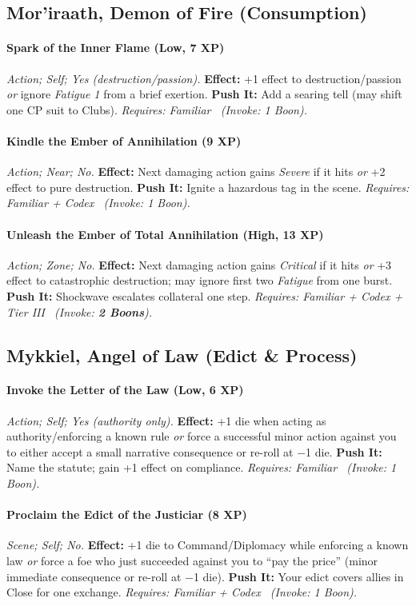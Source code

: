 \documentclass[12pt,twoside]{book}
\begin{document}
\subsection{Mor’iraath, Demon of Fire (Consumption)}
\paragraph{Spark of the Inner Flame (Low, 7 XP)} \emph{Action; Self; Yes (destruction/passion).}
\textbf{Effect:} +1 effect to destruction/passion \emph{or} ignore \emph{Fatigue 1} from a brief exertion.
\textbf{Push It:} Add a searing tell (may shift one CP suit to Clubs).
\emph{Requires: Familiar \ (\textit{Invoke:} 1 Boon).}
\paragraph{Kindle the Ember of Annihilation (9 XP)} \emph{Action; Near; No.}
\textbf{Effect:} Next damaging action gains \emph{Severe} if it hits \emph{or} +2 effect to pure destruction.
\textbf{Push It:} Ignite a hazardous tag in the scene.
\emph{Requires: Familiar + Codex \ (\textit{Invoke:} 1 Boon).}
\paragraph{Unleash the Ember of Total Annihilation (High, 13 XP)} \emph{Action; Zone; No.}
\textbf{Effect:} Next damaging action gains \emph{Critical} if it hits \emph{or} +3 effect to catastrophic destruction; may ignore first two \emph{Fatigue} from one burst.
\textbf{Push It:} Shockwave escalates collateral one step.
\emph{Requires: Familiar + Codex + Tier III \ (\textit{Invoke:} \textbf{2 Boons}).}

\subsection{Mykkiel, Angel of Law (Edict \& Process)}
\paragraph{Invoke the Letter of the Law (Low, 6 XP)} \emph{Action; Self; Yes (authority only).}
\textbf{Effect:} +1 die when acting as authority/enforcing a known rule \emph{or} force a successful minor action against you to either accept a small narrative consequence or re-roll at −1 die.
\textbf{Push It:} Name the statute; gain +1 effect on compliance.
\emph{Requires: Familiar \ (\textit{Invoke:} 1 Boon).}
\paragraph{Proclaim the Edict of the Justiciar (8 XP)} \emph{Scene; Self; No.}
\textbf{Effect:} +1 die to Command/Diplomacy while enforcing a known law \emph{or} force a foe who just succeeded against you to ``pay the price'' (minor immediate consequence or re-roll at −1 die).
\textbf{Push It:} Your edict covers allies in Close for one exchange.
\emph{Requires: Familiar + Codex \ (\textit{Invoke:} 1 Boon).}
\end{document}
